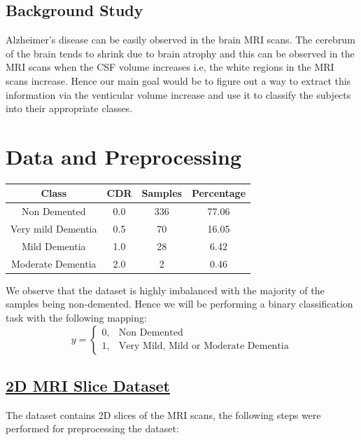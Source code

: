 \documentclass[10pt,twocolumn]{article}
\begin{document}
    \subsection{Background Study}
        Alzheimer's disease can be easily observed in the brain MRI scans. The cerebrum of the brain tends to shrink due to brain atrophy and this can be observed in the MRI scans when the CSF volume increases i.e, the white regions in the MRI scans increase. Hence our main goal would be to figure out a way to extract this information via the venticular volume increase and use it to classify the subjects into their appropriate classes.


\section{Data and Preprocessing}
    \begin{center}
        \begin{tabular}{c|c|c|c}
            \toprule
            Class & CDR & Samples & Percentage \\
            \midrule
            Non Demented & 0.0 & 336 & 77.06 \\
            Very mild Dementia & 0.5 & 70 & 16.05 \\
            Mild Dementia & 1.0 & 28 & 6.42 \\
            Moderate Dementia & 2.0 & 2 & 0.46 \\
            \bottomrule
        \end{tabular}
    \end{center}
    
    \noindent
    We observe that the dataset is highly imbalanced with the majority of the samples being non-demented. Hence we will be performing a binary classification task with the following mapping:
    \[
    y =
    \begin{cases}
    0, & \text{Non Demented}\\
    1, & \text{Very Mild, Mild or Moderate Dementia}
    \end{cases}
    \]

    \subsection{\href{https://www.kaggle.com/datasets/ninadaithal/imagesoasis}{2D MRI Slice Dataset}}
         The dataset contains 2D slices of the MRI scans, the following steps were performed for preprocessing the dataset:
\end{document}
